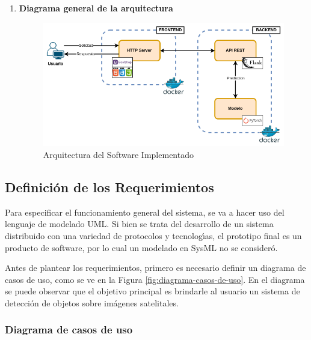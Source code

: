 \begin{enumerate}
    \item \textbf{Diagrama general de la arquitectura }
    \begin{figure}[h!]
        \centering
        \includegraphics[width=1\textwidth,center]{img/BE - API - FE.drawio.png}
        \caption{Arquitectura del Software Implementado}
        \label{fig:be - api - fe}
    \end{figure}
    
    
\end{enumerate}

\newpage
\subsection{Definición de los Requerimientos} %

Para especificar el funcionamiento general del sistema, se va a hacer uso del lenguaje de modelado UML. Si bien se trata del desarrollo de un sistema distribuido con una variedad de protocolos y tecnologı́as, el prototipo final es un producto de software, por lo cual un modelado en SysML \cite{sysml} no se consideró.

Antes de plantear los requerimientos, primero es necesario definir un diagrama de casos de uso, como se ve en la Figura \ref{fig:diagrama-casos-de-uso}. En el diagrama se puede observar que el objetivo principal es brindarle al usuario un sistema de detección de objetos sobre imágenes satelitales.


\subsubsection {Diagrama de casos de uso}

